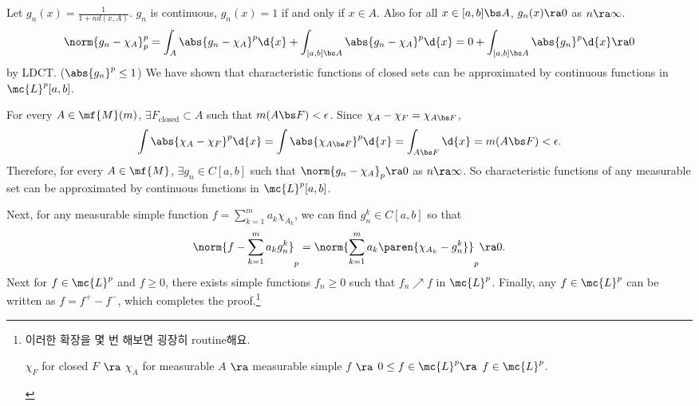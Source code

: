 Let \(g_n(x) = \frac{1}{1 + n d(x, A)}\). \(g_n\) is continuous, \(g_n(x) = 1\) if and only if \(x \in A\). Also for all \(x \in [a, b] \bs A\), \(g_n(x) \ra 0\) as \(n \ra \infty\).
\[
    \norm{g_n - \chi_A}_p^p = \int_A \abs{g_n - \chi_A}^p \d{x} + \int_{[a, b]\bs A} \abs{g_n - \chi_A}^p \d{x} = 0 + \int_{[a, b]\bs A} \abs{g_n}^p  \d{x} \ra 0
\]
by LDCT. (\(\abs{g_n}^p \leq 1\)) We have shown that characteristic functions of closed sets can be approximated by continuous functions in \(\mc{L}^{p}[a, b]\).

For every \(A \in \mf{M}(m)\), \(\exists F_\text{closed} \subset A\) such that \(m(A \bs F) < \epsilon\). Since \(\chi_A - \chi_F = \chi_{A \bs F}\),
\[
    \int \abs{\chi_A-\chi_F}^p \d{x} = \int \abs{\chi_{A\bs F}}^p \d{x} = \int_{A\bs F} \d{x} = m(A \bs F) < \epsilon.
\]
Therefore, for every \(A \in \mf{M}\), \(\exists g_n \in C[a, b]\) such that \(\norm{g_n - \chi_A}_p \ra 0\) as \(n \ra \infty\). So characteristic functions of any measurable set can be approximated by continuous functions in \(\mc{L}^{p}[a, b]\).

Next, for any measurable simple function \(f = \sum_{k=1}^{m}a_k \chi_{A_k}\), we can find \(g_n^k \in C[a, b]\) so that
\[
    \norm{f - \sum_{k=1}^{m} a_k g_n^k}_p = \norm{\sum_{k=1}^{m}a_k \paren{\chi_{A_k} - g_n^k}}_p \ra 0.
\]
Next for \(f \in \mc{L}^{p}\) and \(f \geq 0\), there exists simple functions \(f_n \geq 0\) such that \(f_n \nearrow f\) in \(\mc{L}^{p}\). Finally, any \(f \in \mc{L}^{p}\) can be written as \(f = f^+ - f^-\), which completes the proof.\footnote{이러한 확장을 몇 번 해보면 굉장히 routine해요.
    \begin{center}
        \(\chi_F\) for closed \(F\) \(\ra\) \(\chi_A\) for measurable \(A\) \(\ra\) measurable simple \(f\) \(\ra\) \(0\leq f \in \mc{L}^{p} \ra\) \(f \in \mc{L}^{p}\).
    \end{center}}
\pagebreak
